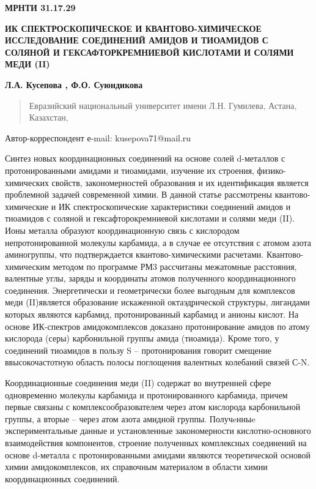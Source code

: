 \newpage
{\bfseries МРНТИ 31.17.29}

{\bfseries ИК СПЕКТРОСКОПИЧЕСКОЕ И КВАНТОВО-ХИМИЧЕСКОЕ ИССЛЕДОВАНИЕ
СОЕДИНЕНИЙ АМИДОВ И ТИОАМИДОВ С СОЛЯНОЙ И ГЕКСАФТОРКРЕМНИЕВОЙ КИСЛОТАМИ
И СОЛЯМИ МЕДИ (II)}

{\bfseries Л.А. Кусепова , Ф.О. Суюндикова}

\begin{quote}
Евразийский национальный университет имени Л.Н. Гумилева, Астана,
Казахстан,
\end{quote}

Автор-корреспондент е-mail: kusepova71@mail.ru

Синтез новых координационных соединений на основе солей d-металлов с
протонированными амидами и тиоамидами, изучение их строения,
физико-химических свойств, закономерностей образования и их
идентификация является проблемной задачей современной химии. В данной
статье рассмотрены квантово-химические и ИК спектроскопические
характеристики соединений амидов и тиоамидов с соляной и
гексафторокремниевой кислотами и солями меди (II). Ионы металла образуют
координационную связь с кислородом непротонированной молекулы карбамида,
а в случае ее отсутствия с атомом азота аминогруппы, что подтверждается
квантово-химическими расчетами. Квантово-химическим методом по программе
РМ3 рассчитаны межатомные расстояния, валентные углы, заряды и
координаты атомов полученного координационного соединения. Энергетически
и геометрически более выгодным для комплексов меди (II)является
образование искаженной октаэдрической структуры, лигандами которых
являются карбамид, протонированный карбамид и анионы кислот. На основе
ИК-спектров амидокомплексов доказано протонирование амидов по атому
кислорода (серы) карбонильной группы амида (тиоамида). Кроме того, у
соединений тиоамидов в пользу S -- протонирования говорит смещение
ввысокочастотную область полосы поглощения валентных колебаний связей
С-N.

Координационные соединения меди (II) содержат во внутренней сфере
одновременно молекулы карбамида и протонированного карбамида, причем
первые связаны с комплексообразователем через атом кислорода
карбонильной группы, а вторые -- через атом азота амидной группы.
Получeнныe экспериментальные данные и установленные закономерности
кислотно-основного взаимодействия компонентов, строение полученных
комплексных соединений на основе d-металла с протонированными амидами
являются теоретической основой химии амидокомплексов, их справочным
материалом в области химии координационных соединений.

